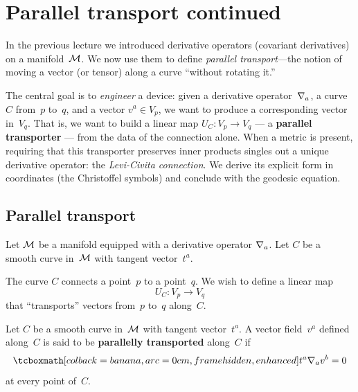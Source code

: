 
\section{Parallel transport continued}\label{sec:parallel-transport-contd}

In the previous lecture we introduced derivative operators
(covariant derivatives) on a manifold~$\mathcal{M}$.  We now use them to
define \emph{parallel transport}---the notion of moving a vector
(or tensor) along a curve ``without rotating it.''

The central goal is to \emph{engineer} a device: given a
derivative operator~$\nabla_a$, a curve~$C$ from~$p$ to~$q$, and
a vector $v^a \in V_p$, we want to produce a corresponding
vector in~$V_q$.  That is, we want to build a linear map
$U_C\colon V_p \to V_q$ --- a \textbf{parallel transporter} ---
from the data of the connection alone.  When a metric is present,
requiring that this transporter preserves inner products singles
out a unique derivative operator: the \emph{Levi-Civita
connection}.  We derive its explicit form in coordinates (the
Christoffel symbols) and conclude with the geodesic equation.

\subsection{Parallel transport}\label{sec:parallel-transport-def}

Let $\mathcal{M}$ be a manifold equipped with a derivative operator
$\nabla_a$.  Let $C$ be a smooth curve in~$\mathcal{M}$ with tangent
vector~$t^a$.



The curve $C$ connects a point~$p$ to a point~$q$.  We wish to
define a linear map
\[
  U_C\colon V_p \to V_q
\]
that ``transports'' vectors from~$p$ to~$q$ along~$C$.

\begin{definition}%
\label{def:parallel-transport}
  Let $C$ be a smooth curve in~$\mathcal{M}$ with tangent vector~$t^a$.
  A vector field~$v^a$ defined along~$C$ is said to be
  \textbf{parallelly transported} along~$C$ if
  \begin{equation}\label{eq:parallel-transport-vec}
    \eqbox{t^a \covd_a v^b = 0}
  \end{equation}
  at every point of~$C$.
\end{definition}

